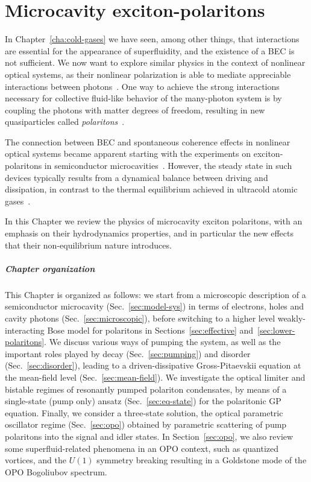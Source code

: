 \chapter{Microcavity exciton-polaritons}
\label{cha:polaritons}

In Chapter~\ref{cha:cold-gases} we have seen, among other things, that
interactions are essential for the appearance of superfluidity, and
the existence of a BEC is not sufficient. We now want to explore
similar physics in the context of nonlinear optical systems, as their
nonlinear polarization is able to mediate appreciable interactions
between photons~\cite{Boyd}. One way to achieve the strong
interactions necessary for collective fluid-like behavior of the
many-photon system is by coupling the photons with matter degrees of
freedom, resulting in new quasiparticles called
\textit{polaritons}~\cite{Hopfield1958}.

The connection between BEC and spontaneous coherence effects in
nonlinear optical systems became apparent starting with the
experiments on exciton-polaritons in semiconductor
microcavities~\cite{Baumberg_2000, Stevenson_2000, Baas2006,
  Kasprzak_2006}. However, the steady state in such devices typically
results from a dynamical balance between driving and dissipation, in
contrast to the thermal equilibrium achieved in ultracold atomic
gases~\cite{Carusotto_2013}.

In this Chapter we review the physics of microcavity exciton
polaritons, with an emphasis on their hydrodynamics properties, and in
particular the new effects that their non-equilibrium nature
introduces.

\paragraph{Chapter organization}
This Chapter is organized as follows: we start from a microscopic
description of a semiconductor microcavity (Sec.~\ref{sec:model-sys})
in terms of electrons, holes and cavity photons
(Sec.~\ref{sec:microscopic}), before switching to a higher level
weakly-interacting Bose model for polaritons in
Sections~\ref{sec:effective} and~\ref{sec:lower-polaritons}. We
discuss various ways of pumping the system, as well as the important
roles played by decay (Sec.~\ref{sec:pumping}) and disorder
(Sec.~\ref{sec:disorder}), leading to a driven-dissipative
Gross-Pitaevskii equation at the mean-field level
(Sec.~\ref{sec:mean-field}). We investigate the optical limiter and
bistable regimes of resonantly pumped polariton condensates, by means
of a single-state (pump only) ansatz (Sec.~\ref{sec:eq-state}) for the
polaritonic GP equation. Finally, we consider a three-state solution,
the optical parametric oscillator regime (Sec.~\ref{sec:opo}) obtained
by parametric scattering of pump polaritons into the signal and idler
states. In Section~\ref{sec:opo}, we also review some
superfluid-related phenomena in an OPO context, such as quantized
vortices, and the $U(1)$ symmetry breaking resulting in a Goldstone
mode of the OPO Bogoliubov spectrum.


